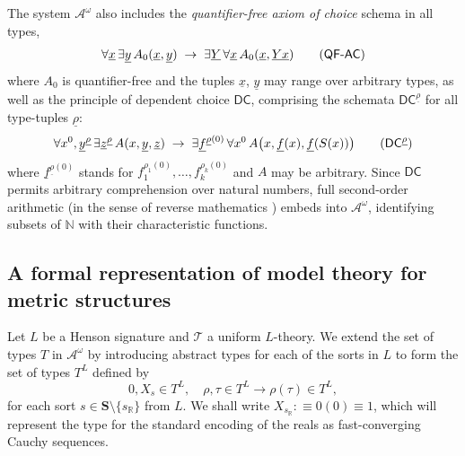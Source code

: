 \documentclass[11pt]{amsart}
\theoremstyle{definition}
\theoremstyle{remark}
\def\NN{\mathbb{N}}
\def\RR{\mathbb{R}}
\newcommand{\DC}{\textsf{DC}}
\begin{document}
The system $\mathcal{A}^\omega$ also includes the \emph{quantifier-free axiom
of choice} schema in all types,
\[
  \forall \underline{x}\,\exists \underline{y}\, A_0(\underline{x},\underline{y})
  \;\to\;
  \exists \underline{Y}\,\forall \underline{x}\, A_0(\underline{x},\underline{Y}\underline{x})
  \tag{$\mathsf{QF}$-$\mathsf{AC}$}
\]
where $A_0$ is quantifier-free and the tuples $\underline{x}$, $\underline{y}$
may range over arbitrary types, as well as the principle of dependent choice
$\DC$, comprising the schemata $\DC^{\underline{\rho}}$ for all type-tuples
$\underline{\rho}$:
\[
  \forall x^0,\underline{y}^{\underline{\rho}}\,
  \exists \underline{z}^{\underline{\rho}}\, A(x,\underline{y},\underline{z})
  \;\to\;
  \exists \underline{f}^{\underline{\rho}(0)}\,
  \forall x^0\, A\bigl(x,\underline{f}(x),\underline{f}(S(x))\bigr)
  \tag{$\DC^{\underline{\rho}}$}
\]
where $\underline{f}^{\underline{\rho}(0)}$ stands for
$f_1^{\rho_1(0)},\dots,f_k^{\rho_k(0)}$ and $A$ may be arbitrary. Since $\DC$
permits arbitrary comprehension over natural numbers, full second-order
arithmetic (in the sense of reverse mathematics \cite{simpson2009subsystems})
embeds into $\mathcal{A}^\omega$, identifying subsets of $\NN$ with their
characteristic functions.


\subsection{A formal representation of model theory for metric structures}
Let $L$ be a Henson signature and $\mathcal{T}$ a uniform $L$-theory. We extend the set of types $T$ in  $\mathcal{A}^\omega$ by introducing abstract types for each of the sorts in $L$ to form the set of types $T^L$ defined by 
\[
0,X_s\in T^L,\quad \rho,\tau\in T^L\rightarrow \rho(\tau)\in T^L,
\]
for each sort $s \in \mathbf{S}\setminus\{s_\RR\}$ from $L$. We shall write $X_{s_\RR}:\equiv 0(0)\equiv 1$, which will represent the type for the standard encoding of the reals as fast-converging Cauchy sequences.
\end{document}

